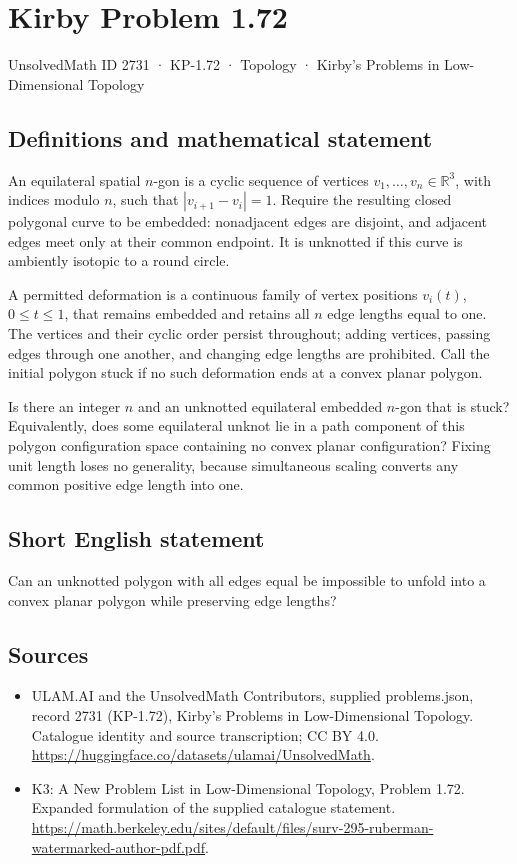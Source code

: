 \documentclass[11pt,a4paper]{article}
\begin{document}
\section*{Kirby Problem 1.72}\label{2731}
{\small UnsolvedMath ID 2731 · KP-1.72 · Topology · Kirby's Problems in Low-Dimensional Topology}
\subsection{Definitions and mathematical statement}
An equilateral spatial $n$-gon is a cyclic sequence of vertices
$v_1,\ldots,v_n\in\mathbb R^3$, with indices modulo $n$, such that
$|v_{i+1}-v_i|=1$. Require the resulting closed polygonal curve to be embedded:
nonadjacent edges are disjoint, and adjacent edges meet only at their common
endpoint. It is unknotted if this curve is ambiently isotopic to a round circle.

A permitted deformation is a continuous family of vertex positions $v_i(t)$,
$0\leq t\leq1$, that remains embedded and retains all $n$ edge lengths equal to
one. The vertices and their cyclic order persist throughout; adding vertices,
passing edges through one another, and changing edge lengths are prohibited.
Call the initial polygon stuck if no such deformation ends at a convex planar
polygon.

Is there an integer $n$ and an unknotted equilateral embedded $n$-gon that is
stuck? Equivalently, does some equilateral unknot lie in a path component of this
polygon configuration space containing no convex planar configuration? Fixing
unit length loses no generality, because simultaneous scaling converts any
common positive edge length into one.
\subsection{Short English statement}
Can an unknotted polygon with all edges equal be impossible to unfold into a convex planar polygon while preserving edge lengths?
\subsection{Sources}
\begin{itemize}
\item[S1] ULAM.AI and the UnsolvedMath Contributors, supplied problems.json, record 2731 (KP-1.72), Kirby's Problems in Low-Dimensional Topology. Catalogue identity and source transcription; CC BY 4.0.
\url{https://huggingface.co/datasets/ulamai/UnsolvedMath}.
\item[S2] K3: A New Problem List in Low-Dimensional Topology, Problem 1.72. Expanded formulation of the supplied catalogue statement.
\url{https://math.berkeley.edu/sites/default/files/surv-295-ruberman-watermarked-author-pdf.pdf}.
\end{itemize}
\end{document}
